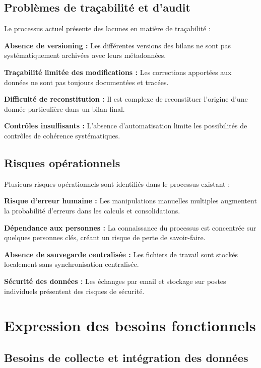 \subsection{Problèmes de traçabilité et d'audit}

Le processus actuel présente des lacunes en matière de traçabilité :

\medskip

\textbf{Absence de versioning :} Les différentes versions des bilans ne sont pas systématiquement archivées avec leurs métadonnées.

\textbf{Traçabilité limitée des modifications :} Les corrections apportées aux données ne sont pas toujours documentées et tracées.

\textbf{Difficulté de reconstitution :} Il est complexe de reconstituer l'origine d'une donnée particulière dans un bilan final.

\textbf{Contrôles insuffisants :} L'absence d'automatisation limite les possibilités de contrôles de cohérence systématiques.

\subsection{Risques opérationnels}

Plusieurs risques opérationnels sont identifiés dans le processus existant :

\medskip

\textbf{Risque d'erreur humaine :} Les manipulations manuelles multiples augmentent la probabilité d'erreurs dans les calculs et consolidations.

\textbf{Dépendance aux personnes :} La connaissance du processus est concentrée sur quelques personnes clés, créant un risque de perte de savoir-faire.

\textbf{Absence de sauvegarde centralisée :} Les fichiers de travail sont stockés localement sans synchronisation centralisée.

\textbf{Sécurité des données :} Les échanges par email et stockage sur postes individuels présentent des risques de sécurité.

\section{Expression des besoins fonctionnels}

\subsection{Besoins de collecte et intégration des données}

